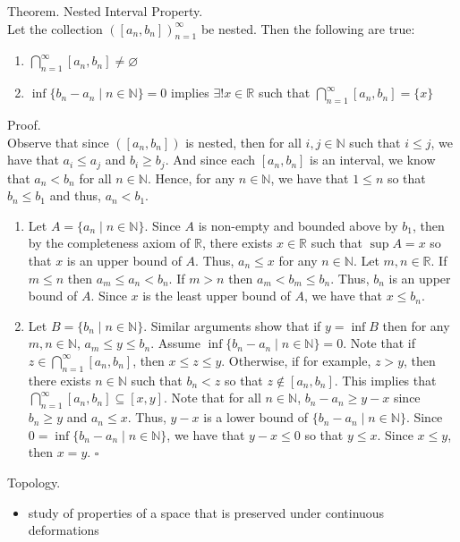 \documentclass[twocolumn]{article}
\newcommand{\qed}{$\square$}
\newcommand{\br}{\vspace{\baselineskip}}
\let\emptyset\varnothing
\newcommand{\naturals}{\mathbb{N}}
\newcommand{\reals}{\mathbb{R}}
\begin{document}
Theorem. Nested Interval Property. \\
Let the collection $([a_n, b_n])_{n = 1}^\infty$ be nested. Then the following are true:
\begin{enumerate}
	\item
		$\bigcap_{n = 1}^\infty [a_n, b_n] \neq \emptyset$
	\item
		$\inf \{ b_n - a_n \mid n \in \naturals \} = 0$ implies $\exists! x \in \reals$ such that $\bigcap_{n = 1}^\infty [a_n, b_n] = \{ x \}$
\end{enumerate}
Proof. \\
Observe that since $([a_n, b_n])$ is nested, then for all $i, j \in \naturals$ such that $i \leq j$, we have that $a_i \leq a_j$ and $b_i \geq b_j$. And since each $[a_n, b_n]$ is an interval, we know that $a_n < b_n$ for all $n \in \naturals$. Hence, for any $n \in \naturals$, we have that $1 \leq n$ so that $b_n \leq b_1$ and thus, $a_n < b_1$.
\begin{enumerate}
	\item
		Let $A = \{ a_n \mid n \in \naturals \}$. Since $A$ is non-empty and bounded above by $b_1$, then by the completeness axiom of $\reals$, there exists $x \in \reals$ such that $\sup A = x$ so that $x$ is an upper bound of $A$. Thus, $a_n \leq x$ for any $n \in \naturals$. Let $m, n \in \reals$. If $m \leq n$ then $a_m \leq a_n < b_n$. If $m > n$ then $a_m < b_m \leq b_n$. Thus, $b_n$ is an upper bound of $A$. Since $x$ is the least upper bound of $A$, we have that $x \leq b_n$.
	\item
		Let $B = \{ b_n \mid n \in \naturals \}$. Similar arguments show that if $y = \inf B$ then for any $m, n \in \naturals$, $a_m \leq y \leq b_n$. Assume $\inf \{ b_n - a_n \mid n \in \naturals \} = 0$. Note that if $z \in \bigcap_{n = 1}^\infty [a_n, b_n]$, then $x \leq z \leq y$. Otherwise, if for example, $z > y$, then there exists $n \in \naturals$ such that $b_n < z$ so that $z \not\in [a_n, b_n]$. This implies that $\bigcap_{n = 1}^\infty [a_n, b_n] \subseteq [x, y]$. Note that for all $n \in \naturals$, $b_n - a_n \geq y - x$ since $b_n \geq y$ and $a_n \leq x$. Thus, $y - x$ is a lower bound of $\{ b_n - a_n \mid n \in \naturals \}$. Since $0 = \inf \{ b_n - a_n \mid n \in \naturals \}$, we have that $y - x \leq 0$ so that $y \leq x$. Since $x \leq y$, then $x = y$. \qed
\end{enumerate} \br

Topology.
\begin{itemize}
	\item
		study of properties of a space that is preserved under continuous deformations
\end{itemize} \br
\end{document}
